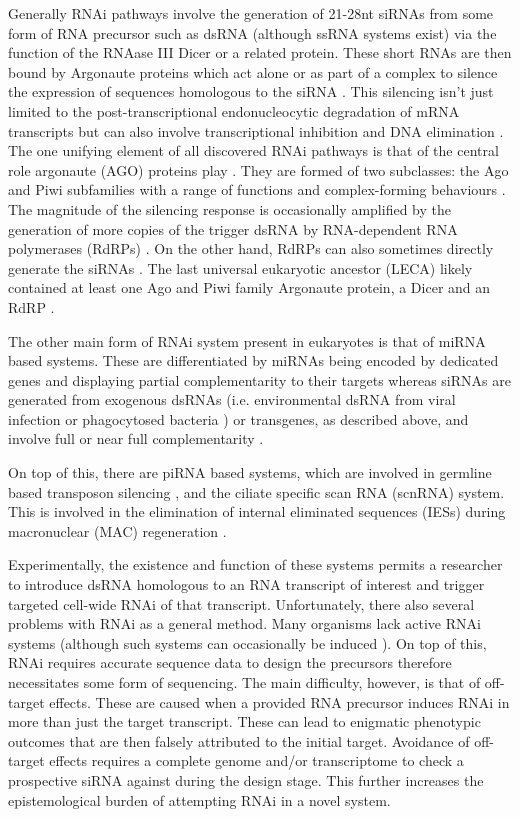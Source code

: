 Generally RNAi pathways involve the generation of 21-28nt siRNAs
from some form of RNA precursor such as dsRNA (although ssRNA systems exist)
via the function of the RNAase III Dicer \citep{Bernstein2001} or a related protein. 
These short RNAs are then bound by Argonaute proteins which act alone or as part
of a complex to silence the expression of sequences homologous to the siRNA \citep{Ketting2011}.
This silencing isn't just limited to the post-transcriptional endonucleocytic degradation of 
mRNA transcripts but can also involve transcriptional inhibition and
DNA elimination \citep{Marker2014}.
The one unifying element of all discovered RNAi pathways is that
of the central role argonaute (AGO) proteins play \citep{Ketting2011}.
They are formed of two subclasses: the Ago and Piwi subfamilies \citep{Peters2007}
with a range of functions and complex-forming behaviours
\citep{Ender2010}.
The magnitude of the silencing response is occasionally amplified by the generation
of more copies of the trigger dsRNA by RNA-dependent RNA polymerases (RdRPs) \citep{Arp2007}.
On the other hand, RdRPs can also sometimes directly generate the siRNAs \citep{Aoki2007,Ketting2011}.
The last universal eukaryotic ancestor (LECA) likely contained 
at least one Ago and Piwi family Argonaute protein, a Dicer and an RdRP \citep{Cerutti2006}.

The other main form of RNAi system present in eukaryotes is that of 
miRNA based systems.  These are differentiated
by miRNAs being encoded by dedicated genes and displaying partial
complementarity to their targets whereas siRNAs are generated from exogenous
dsRNAs (i.e. environmental dsRNA from viral infection or phagocytosed bacteria \citep{Whangbo2008})
or transgenes, as described above, and involve full or near full complementarity \citep{Shabalina2008}.

On top of this, there are piRNA based systems, which are involved in germline based transposon 
silencing \citep{Iwasaki2015}, and the ciliate specific scan RNA (scnRNA) system.
This is involved in the elimination of internal eliminated sequences (IESs) during
macronuclear (MAC) regeneration \citep{Mochizuki2004,Kiefer2013}.


Experimentally, the existence and function of these systems
permits a researcher to introduce dsRNA homologous to an RNA transcript of interest
and trigger targeted cell-wide RNAi of that transcript.
Unfortunately, there also several problems with RNAi as a general method.
Many organisms lack active RNAi systems (although such systems can occasionally
be induced \citep{Alibu2005}).
On top of this, RNAi requires accurate sequence data to design the precursors
therefore necessitates some form of sequencing. 
The main difficulty, however, is that of off-target effects.
These are caused when a provided RNA precursor induces RNAi
in more than just the target transcript.  These
can lead to enigmatic phenotypic outcomes that 
are then falsely attributed to the initial target.
Avoidance of off-target effects 
requires a complete genome and/or transcriptome
to check a prospective siRNA against during the design
stage.  This further increases the epistemological
burden of attempting RNAi in a novel system.

